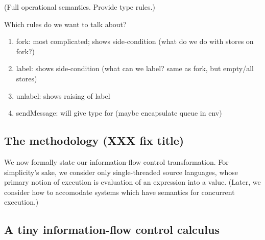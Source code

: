 {(Full operational semantics. Provide type rules.)


Which rules do we want to talk about?

\begin{enumerate}
\item fork: most complicated; shows side-condition (what do we do with stores on fork?)
\item label:  shows side-condition (what can we label? same as fork, but empty/all stores)
\item unlabel: shows raising of label
\item sendMessage: will give type for (maybe encapsulate queue in env)
\end{enumerate}

\subsection{The methodology (XXX fix title)}
\label{sec:methodology}

We now formally state our information-flow control transformation.  For
simplicity's sake, we consider only single-threaded source languages,
whose primary notion of execution is evaluation of an expression into a
value.  (Later, we consider how to accomodate systems which have
semantics for concurrent execution.)

\subsection{A tiny information-flow control calculus}

}
